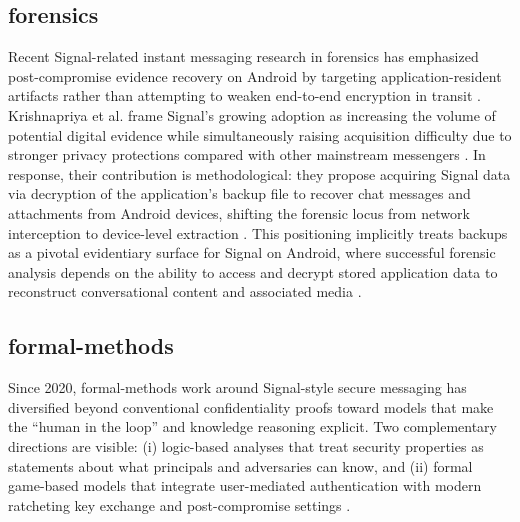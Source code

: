 \subsection{forensics}
Recent Signal-related instant messaging research in forensics has emphasized post-compromise evidence recovery on Android by targeting application-resident artifacts rather than attempting to weaken end-to-end encryption in transit \cite{krishnapriya2021}. Krishnapriya et al. frame Signal’s growing adoption as increasing the volume of potential digital evidence while simultaneously raising acquisition difficulty due to stronger privacy protections compared with other mainstream messengers \cite{krishnapriya2021}. In response, their contribution is methodological: they propose acquiring Signal data via decryption of the application’s backup file to recover chat messages and attachments from Android devices, shifting the forensic locus from network interception to device-level extraction \cite{krishnapriya2021}. This positioning implicitly treats backups as a pivotal evidentiary surface for Signal on Android, where successful forensic analysis depends on the ability to access and decrypt stored application data to reconstruct conversational content and associated media \cite{krishnapriya2021}.

\subsection{formal-methods}
Since 2020, formal-methods work around Signal-style secure messaging has diversified beyond conventional confidentiality proofs toward models that make the ``human in the loop'' and knowledge reasoning explicit. Two complementary directions are visible: (i) logic-based analyses that treat security properties as statements about what principals and adversaries can know, and (ii) formal game-based models that integrate user-mediated authentication with modern ratcheting key exchange and post-compromise settings \cite{kamkuemah2021,dowling2021}.

